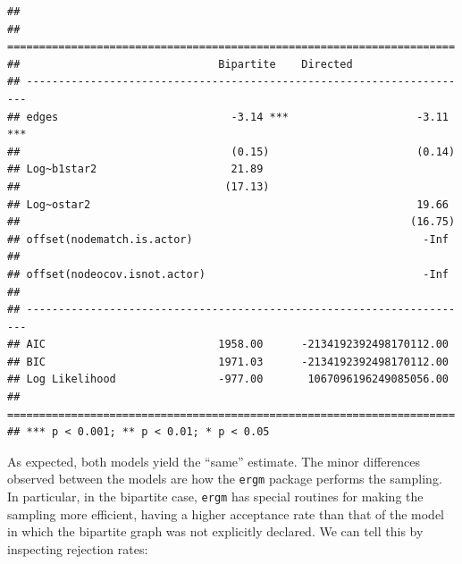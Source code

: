 \documentclass[
]{book}
\newenvironment{Shaded}{\begin{snugshade}}{\end{snugshade}}
\newcommand{\AttributeTok}[1]{\textcolor[rgb]{0.13,0.29,0.53}{#1}}
\newcommand{\DecValTok}[1]{\textcolor[rgb]{0.00,0.00,0.81}{#1}}
\newcommand{\FunctionTok}[1]{\textcolor[rgb]{0.13,0.29,0.53}{\textbf{#1}}}
\newcommand{\NormalTok}[1]{#1}
\newcommand{\SpecialCharTok}[1]{\textcolor[rgb]{0.81,0.36,0.00}{\textbf{#1}}}
\newcommand{\StringTok}[1]{\textcolor[rgb]{0.31,0.60,0.02}{#1}}
\begin{document}
\begin{verbatim}
## 
## ======================================================================
##                               Bipartite    Directed                   
## ----------------------------------------------------------------------
## edges                           -3.14 ***                    -3.11 ***
##                                 (0.15)                       (0.14)   
## Log~b1star2                     21.89                                 
##                                (17.13)                                
## Log~ostar2                                                   19.66    
##                                                             (16.75)   
## offset(nodematch.is.actor)                                    -Inf    
##                                                                       
## offset(nodeocov.isnot.actor)                                  -Inf    
##                                                                       
## ----------------------------------------------------------------------
## AIC                           1958.00      -2134192392498170112.00    
## BIC                           1971.03      -2134192392498170112.00    
## Log Likelihood                -977.00       1067096196249085056.00    
## ======================================================================
## *** p < 0.001; ** p < 0.01; * p < 0.05
\end{verbatim}

As expected, both models yield the ``same'' estimate. The minor differences
observed between the models are how the \texttt{ergm} package performs
the sampling. In particular, in the bipartite case, \texttt{ergm} has special
routines for making the sampling more efficient, having a higher acceptance
rate than that of the model in which the bipartite graph was not explicitly
declared. We can tell this by inspecting rejection rates:

\begin{Shaded}
\end{Shaded}
\end{document}
